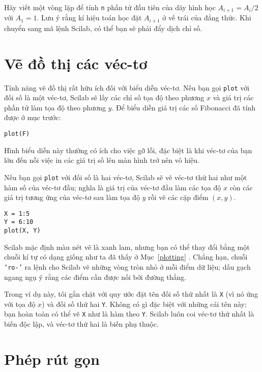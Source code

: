 \documentclass[12pt]{book}
\begin{document}
\begin{ex}
Hãy viết một vòng lặp để tính {\tt n} phần tử đầu tiên của
dãy hình học $A_{i+1} = A_i/2$ với $A_1 = 1$. Lưu ý rằng
kí hiệu toán học đặt $A_{i+1}$ ở vế trái của đẳng thức.
Khi chuyển sang mã lệnh Scilab, có thể bạn sẽ phải đẩy dịch
chỉ số.
\end{ex}


\section{Vẽ đồ thị các véc-tơ}

Tính năng vẽ đồ thị rất hữu ích đối với biểu diễn véc-tơ. Nếu bạn
gọi {\tt plot} với đối số là một véc-tơ, Scilab sẽ lấy các 
chỉ số tọa độ theo phương $x$ và giá trị các phần tử làm tọa độ
theo phương $y$. Để biểu diễn giá trị các số Fibonacci đã tính được ở
mục trước:

\begin{verbatim}
plot(F)
\end{verbatim}

Hình biểu diễn này thường có ích cho việc gỡ lỗi, đặc biệt là khi
véc-tơ của bạn lớn đến nỗi việc in các giá trị số lên màn hình
trở nên vô hiệu.

Nếu bạn gọi {\tt plot} với đối số là hai véc-tơ, Scilab sẽ 
vẽ véc-tơ thứ hai như một hàm số của véc-tơ đầu; nghĩa là 
giá trị của véc-tơ đầu làm các tọa độ $x$ còn các giá trị tương ứng
của véc-tơ sau làm tọa độ $y$ rồi vẽ các cặp điểm $(x, y)$.

\begin{verbatim}
X = 1:5
Y = 6:10
plot(X, Y)
\end{verbatim}

Scilab mặc định màu nét vẽ là xanh lam, nhưng bạn có thể thay đổi
bằng một chuỗi kí tự có dạng giống như ta đã thấy ở Mục~\ref{plotting} .
Chẳng hạn, chuỗi {\tt 'ro-'} ra lệnh cho Scilab vẽ những vòng tròn nhỏ
ở mỗi điểm dữ liệu; dấu gạch ngang ngụ ý rằng các điểm cần được nối
bởi đường thẳng.

Trong ví dụ này, tôi gắn chặt với quy ước đặt tên đối số thứ nhất
là {\tt X} (vì nó ứng với tọa độ $x$) và đối số thứ hai {\tt Y}.
Không có gì đặc biệt với những cái tên này; bạn hoàn toàn
có thể vẽ {\tt X} như là hàm theo {\tt Y}. Scilab luôn coi 
véc-tơ thứ nhất là biến độc lập, và véc-tơ thứ hai là biến phụ thuộc.



\section{Phép rút gọn}
\label{reduce}
\end{document}
